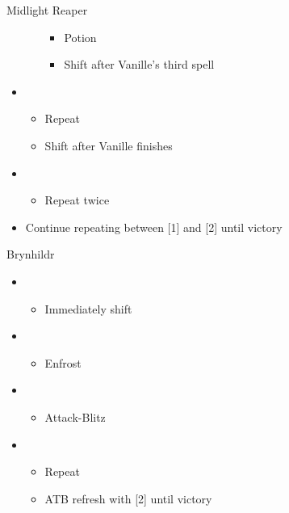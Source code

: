 \begin{multicols}{2}
\begin{battle}{Midlight Reaper}
\begin{itemize}
\begin{itemize}
\begin{itemize}
            \item Potion
            \item Shift after Vanille's third spell
        \end{itemize}
    \end{itemize}
    \item \first
    \begin{itemize}
        \item Repeat
        \item Shift after Vanille finishes
    \end{itemize}
    \item \second
    \begin{itemize}
        \item Repeat twice
    \end{itemize}
    \item Continue repeating between [1] and [2] until victory
\end{itemize}
\end{battle}

\begin{battle}{Brynhildr}
\begin{itemize}
    \item \first
    \begin{itemize}
        \item Immediately shift
    \end{itemize}
    \item \third
    \begin{itemize}
        \item Enfrost
    \end{itemize}
    \item \first
    \begin{itemize}
        \item Attack-Blitz
    \end{itemize}
    \item \second
    \begin{itemize}
        \item Repeat
        \item ATB refresh with [2] until victory
    \end{itemize}
\end{itemize}
\end{battle}
\end{multicols}
